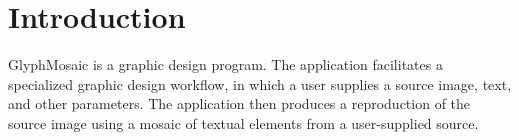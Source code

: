 \section{Introduction}
GlyphMosaic is a graphic design program.
The application facilitates a specialized graphic design workflow, in which a user supplies a source image, text, and other parameters.
The application then produces a reproduction of the source image using a mosaic of textual elements from a user-supplied source.